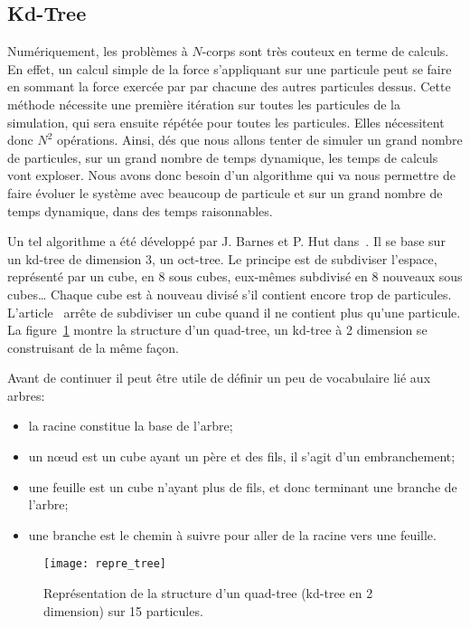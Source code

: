 		\subsection{Kd-Tree}
			Numériquement, les problèmes à $N$-corps sont très couteux en terme de calculs. En effet, un
			calcul simple de la force s'appliquant sur une particule peut se faire en sommant la force exercée par
			par chacune des autres particules dessus. Cette méthode nécessite une première itération sur toutes les
			particules de la simulation, qui sera ensuite répétée pour toutes les particules. Elles
			nécessitent donc $N^2$ opérations.
			Ainsi, dés que nous allons tenter de simuler un grand nombre de particules, sur un grand nombre
			de temps dynamique, les temps de calculs vont exploser.
			Nous avons donc besoin d'un algorithme qui va nous permettre de faire évoluer le
			système avec beaucoup de particule et sur un grand nombre de temps dynamique, dans des temps
			raisonnables.

			Un tel algorithme a été développé par J. Barnes et P. Hut dans~\cite{1986Natur.324..446B}. Il se
			base sur un kd-tree de dimension 3, un oct-tree. Le principe est de subdiviser l'espace,
			représenté par un cube, en 8 sous cubes, eux-mêmes subdivisé en 8 nouveaux sous cubes\ldots
			Chaque cube est à nouveau divisé s'il contient encore trop de particules.
			L'article~\cite{1986Natur.324..446B} arrête de subdiviser un cube quand il ne contient plus
			qu'une particule. La figure~\ref{Fig::KDTree::Repr} montre la structure d'un quad-tree, un
			kd-tree à 2 dimension se construisant de la même façon.

			Avant de continuer il peut être utile de définir un peu de vocabulaire lié aux arbres:
			\begin{itemize}
				\item la racine constitue la base de l'arbre;
				\item un nœud est un cube ayant un père et des fils, il s'agit d'un embranchement;
				\item une feuille est un cube n'ayant plus de fils, et donc terminant une branche de
					l'arbre;
				\item une branche est le chemin à suivre pour aller de la racine vers une feuille.
			\end{itemize}

			\begin{figure}
				\begin{center}
					\texttt{[image: repre\_tree]}
					\caption{\label{Fig::KDTree::Repr}Représentation de la structure d'un quad-tree
						(kd-tree en 2 dimension) sur 15 particules.}
				\end{center}
			\end{figure}

